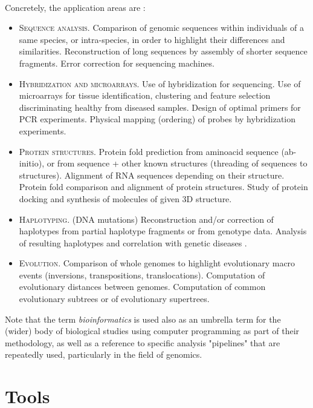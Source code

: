 \paragraph{}
Concretely, the application areas are \cite{a1020100}:
\begin{itemize}
	\item \textsc{Sequence analysis.} Comparison of genomic sequences within individuals of a same species, or intra-species, in order to highlight their differences and similarities. Reconstruction of long sequences by assembly of shorter sequence fragments. Error correction for sequencing machines.
	\item \textsc{Hybridization and microarrays.} Use of hybridization for sequencing. Use of microarrays for tissue identification, clustering and feature selection discriminating healthy from diseased samples. Design of optimal primers for PCR experiments. Physical mapping (ordering) of probes by hybridization experiments.
	\item \textsc{Protein structures.} Protein fold prediction from aminoacid sequence (ab-initio), or from sequence + other known structures (threading of sequences to structures). Alignment of RNA sequences depending on their structure. Protein fold comparison and alignment of protein structures. Study of protein docking and synthesis of molecules of given 3D structure.
	\item \textsc{Haplotyping.} (DNA mutations) Reconstruction and/or correction of haplotypes from partial haplotype fragments or from genotype data. Analysis of resulting haplotypes and correlation with genetic diseases \cite{Bonizzoni2003}.
	\item \textsc{Evolution.} Comparison of whole genomes to highlight evolutionary macro events (inversions, transpositions, translocations). Computation of evolutionary distances between genomes. Computation of common evolutionary subtrees or of evolutionary supertrees.
\end{itemize}

Note that the term \textit{bioinformatics} is used also as an umbrella term for the (wider) body of biological studies using computer programming as part of their methodology, as well as a reference to specific analysis "pipelines" that are repeatedly used, particularly in the field of genomics.

\section{Tools}